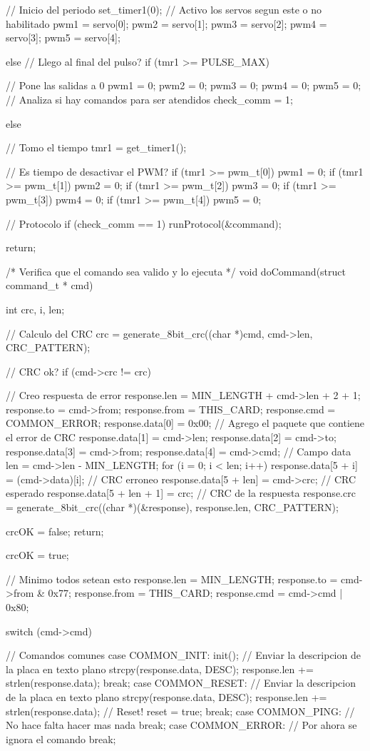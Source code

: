 {\begin{verbatimtab}
{{{			// Inicio del periodo
			set_timer1(0);
			// Activo los servos segun este o no habilitado
			pwm1 = servo[0];
			pwm2 = servo[1];
			pwm3 = servo[2];
			pwm4 = servo[3];
			pwm5 = servo[4];
			
		} else
		// Llego al final del pulso?
		if (tmr1 >= PULSE_MAX)
		{
			// Pone las salidas a 0
			pwm1 = 0;
			pwm2 = 0;
			pwm3 = 0;
			pwm4 = 0;
			pwm5 = 0;
			// Analiza si hay comandos para ser atendidos
			check_comm = 1;
			
		} else {
			// Tomo el tiempo
			tmr1 = get_timer1();

			// Es tiempo de desactivar el PWM?
			if (tmr1 >= pwm_t[0])
				pwm1 = 0;
			if (tmr1 >= pwm_t[1])
				pwm2 = 0;
			if (tmr1 >= pwm_t[2])
				pwm3 = 0;
			if (tmr1 >= pwm_t[3])
				pwm4 = 0;
			if (tmr1 >= pwm_t[4])
				pwm5 = 0;
		}
		
		// Protocolo
		if (check_comm == 1)
			runProtocol(&command);
	}

	return;
}

/* Verifica que el comando sea valido y lo ejecuta */
void doCommand(struct command_t * cmd)
{
	int crc, i, len;
		
	// Calculo del CRC
	crc = generate_8bit_crc((char *)cmd, cmd->len, CRC_PATTERN);
	
	// CRC ok?
	if (cmd->crc != crc)
	{		
		// Creo respuesta de error
		response.len = MIN_LENGTH + cmd->len + 2 + 1;
		response.to = cmd->from;
		response.from = THIS_CARD;
		response.cmd = COMMON_ERROR;
		response.data[0] = 0x00;
		// Agrego el paquete que contiene el error de CRC
		response.data[1] = cmd->len;
		response.data[2] = cmd->to;
		response.data[3] = cmd->from;
		response.data[4] = cmd->cmd;
		// Campo data
		len = cmd->len - MIN_LENGTH;
		for (i = 0; i < len; i++)
			response.data[5 + i] = (cmd->data)[i];
		// CRC erroneo
		response.data[5 + len] = cmd->crc;
		// CRC esperado
		response.data[5 + len + 1] = crc;
		// CRC de la respuesta
		response.crc = generate_8bit_crc((char *)(&response), response.len, CRC_PATTERN);
	
		crcOK = false;
		return;
	}

	crcOK = true;
	
	// Minimo todos setean esto
	response.len = MIN_LENGTH;
	response.to = cmd->from & 0x77;
	response.from = THIS_CARD;
	response.cmd = cmd->cmd | 0x80;

	switch (cmd->cmd)
	{
		// Comandos comunes
		case COMMON_INIT: 
			init();
			// Enviar la descripcion de la placa en texto plano
			strcpy(response.data, DESC);
			response.len += strlen(response.data);
		break;
		case COMMON_RESET: 
			// Enviar la descripcion de la placa en texto plano
			strcpy(response.data, DESC);
			response.len += strlen(response.data);
			// Reset!
			reset = true;
		break;
		case COMMON_PING: 
			// No hace falta hacer mas nada
		break;
 		case COMMON_ERROR:
			// Por ahora se ignora el comando
		break;
		
}}
\end{verbatimtab}}
